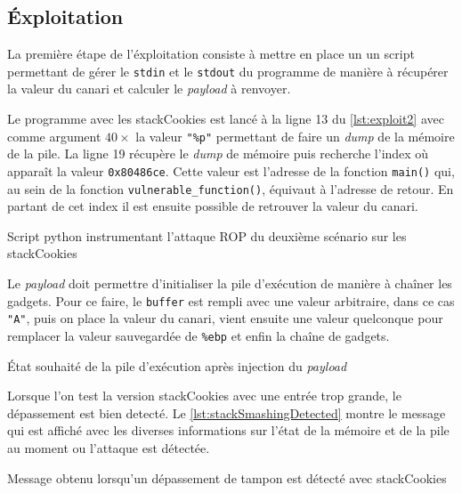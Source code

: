 \subsection{Éxploitation}

La première étape de l'éxploitation consiste à mettre en place un un script permettant
de gérer le \texttt{stdin} et le \texttt{stdout} du programme de manière à récupérer
la valeur du canari et calculer le \textit{payload} à renvoyer.

Le programme avec les \og \gls{stackCookies} \fg est lancé à la ligne 13 du
\autoref{lst:exploit2} avec comme argument $40 \times$ la valeur \texttt{"\%p"}
permettant de faire un \textit{dump} de la mémoire de la pile. La ligne 19 récupère le
\textit{dump} de mémoire puis recherche l'index où apparaît la valeur
\texttt{0x80486ce}. Cette valeur est l'adresse de la fonction \texttt{main()} qui, au
sein de la fonction \texttt{vulnerable\_function()}, équivaut à l'adresse de retour.
En partant de cet index il est ensuite possible de retrouver la valeur du canari.

\begin{listing}
	\caption{Script python instrumentant l'attaque ROP du deuxième scénario sur les \og \gls{stackCookies} \fg}
	\label{lst:exploit2}
\end{listing}

Le \textit{payload} doit permettre d'initialiser la pile d'exécution de manière à
chaîner les gadgets. Pour ce faire, le \texttt{buffer} est rempli avec une valeur
arbitraire, dans ce cas \texttt{"A"}, puis on place la valeur du canari, vient ensuite
une valeur quelconque pour remplacer la valeur sauvegardée de \texttt{\%ebp} et enfin
la chaîne de gadgets.

\begin{listing}
	\caption{État souhaité de la pile d'exécution après injection du \textit{payload}}
	\label{lst:stackAfterPayload}
\end{listing}

Lorsque l'on test la version \og \gls{stackCookies} \fg avec une entrée trop grande,
le dépassement est bien detecté. Le \autoref{lst:stackSmashingDetected} montre le
message qui est affiché avec les diverses informations sur
l'état de la mémoire et de la pile au moment ou l'attaque est détectée.

\begin{listing}
	\caption{Message obtenu lorsqu'un dépassement de tampon est détecté avec \og \gls{stackCookies} \fg}
	\label{lst:stackSmashingDetected}
\end{listing}

